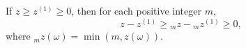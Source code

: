 If $z \geq z^{(1)} \geq 0$, then for each positive integer $m$,
$$z - z^{(1)} \geq {}_m z - {}_m z^{(1)} \geq 0,$$
where ${}_m z(\omega) = \min(m, z(\omega))$.
